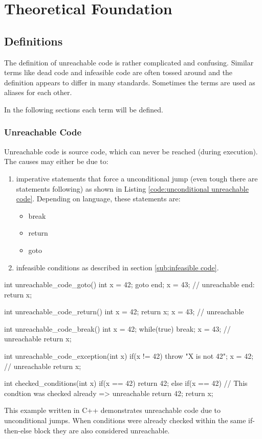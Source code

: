 
\chapter {Theoretical Foundation}
\label {cha:theoretical foundation}

\section{Definitions}
\label{sec:definitions}

The definition of unreachable code is rather complicated and confusing. 
Similar terms like dead code and infeasible code are often tossed around and the definition appears to differ in many standards. 
Sometimes the terms are used as aliases for each other.


In the following sections each term will be defined.

\subsection{Unreachable Code}
\label{sub:unreachable code}
Unreachable code is source code, which can never be reached (during execution). 
The causes may either be due to:
\begin{enumerate}
	\item imperative statements that force a unconditional jump (even tough there are statements following) as shown in Listing \ref{code:unconditional unreachable code}. Depending on language, these statements are: 
	\begin{itemize}
		\item break
		\item return
		\item goto
	\end{itemize}
	\item infeasible conditions as described in section \ref{sub:infeasible code}. 
\end{enumerate}


\begin{program}
	\begin{CppCode}
int unreachable_code_goto() {
	int x = 42;
	goto end;
	x = 43; // unreachable
	end: return x;
}

int unreachable_code_return() {
	int x = 42;
	return x;
	x = 43; // unreachable
}

int unreachable_code_break() {
	int x = 42;
	while(true) {
		break;
		x = 43; // unreachable
	}
	return x;
}

int unreachable_code_exception(int x) {
	if(x != 42) {
		throw "X is not 42";
		x = 42; // unreachable
	}
	return x;
}

int checked_conditions(int x) {
	if(x == 42) {
		return 42;
	} else if(x == 42) { // This condtion was checked already => unreachable
		return 42;
	}
	return x;
}\end{CppCode}
	\caption{This example written in C++ demonstrates unreachable code due to unconditional jumps. When conditions were already checked within the same if-then-else block they are also considered unreachable.}
	\label{code:unconditional unreachable code}
\end{program}


